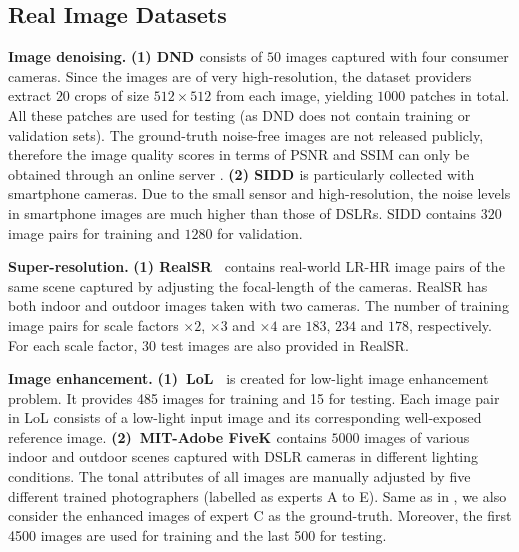 \documentclass[runningheads]{llncs}
\begin{document}
\subsection{Real Image Datasets}
\noindent \textbf{Image denoising.} 
\noindent \textbf{(1) DND \cite{dnd}} consists of $50$ images captured with four consumer cameras.  
Since the images are of very high-resolution, the dataset providers extract $20$ crops of size $512\times512$ from each image, yielding $1000$ patches in total. All these patches are used for testing (as DND does not contain training or validation sets).  
The ground-truth noise-free images are not released publicly, therefore the image quality scores in terms of PSNR and SSIM can only be obtained through an online server \cite{dndwebsite}. 
\noindent \textbf{(2) SIDD \cite{sidd}} is particularly collected with smartphone cameras. Due to the small sensor and high-resolution, the noise levels in smartphone images are much higher than those of DSLRs. 
SIDD contains $320$ image pairs for training and $1280$ for validation. 


\vspace{0.4em}\noindent \textbf{Super-resolution.} 
\noindent \textbf{(1) RealSR~\cite{RealSR}} contains real-world LR-HR image pairs of the same scene captured by adjusting the focal-length of the cameras. 
RealSR has both indoor and outdoor images taken with two cameras. 
The number of training image pairs for scale factors $\times2$, $\times3$ and $\times4$ are $183$, $234$ and $178$, respectively. For each scale factor, $30$ test images are also provided in RealSR.



\vspace{0.4em}\noindent \textbf{Image enhancement.} 
\noindent \textbf{(1)~LoL~\cite{wei2018deep}} is created for low-light image enhancement problem. It provides 485 images for training and 15 for testing. Each image pair in LoL consists of a low-light input image and its corresponding well-exposed reference image.
\noindent \textbf{(2)~MIT-Adobe FiveK \cite{mit_fivek}} contains $5000$ images of various indoor and outdoor scenes captured with DSLR cameras in different lighting conditions. 
The tonal attributes of all images are manually adjusted by five different trained photographers (labelled as experts A to E). 
Same as in \cite{hu2018exposure,park2018distort,wang2019underexposed}, we also consider the enhanced images of expert C as the ground-truth. 
Moreover, the first 4500 images are used for training and the last 500 for testing. 
\end{document}

